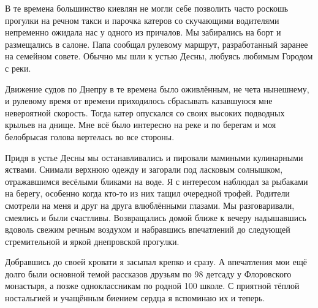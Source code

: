 В те времена большинство киевлян не могли себе позволить часто роскошь прогулки
на речном такси и парочка катеров со скучающими водителями непременно ожидала
нас у одного из причалов. Мы забирались на борт и размещались в салоне. Папа
сообщал рулевому маршрут, разработанный заранее на семейном совете. Обычно мы
шли к устью Десны, любуясь любимым Городом с реки.

Движение судов по Днепру в те времена было оживлённым, не чета нынешнему, и
рулевому время от времени приходилось сбрасывать казавшуюся мне невероятной
скорость. Тогда катер опускался со своих высоких подводных крыльев на днище.
Мне всё было интересно на реке и по берегам и моя белобрысая голова вертелась
во все стороны. 

Придя в устье Десны мы останавливались и пировали мамиными кулинарными яствами.
Снимали верхнюю одежду и загорали под ласковым солнышком, отражавшимся весёлыми
бликами на воде. Я с интересом наблюдал за рыбаками на берегу, особенно когда
кто-то из них тащил очередной трофей. Родители смотрели на меня и друг на друга
влюблёнными глазами. Мы разговаривали, смеялись и были счастливы. Возвращались
домой ближе к вечеру надышавшись вдоволь свежим речным воздухом и набравшись
впечатлений до следующей стремительной и яркой днепровской прогулки. 

Добравшись до своей кровати я засыпал крепко и сразу. А впечатления мои ещё
долго были основной темой рассказов друзьям по 98 детсаду у Флоровского
монастыря, а позже одноклассникам по родной 100 школе. С приятной тёплой
ностальгией и учащённым биением сердца я вспоминаю их и теперь.
